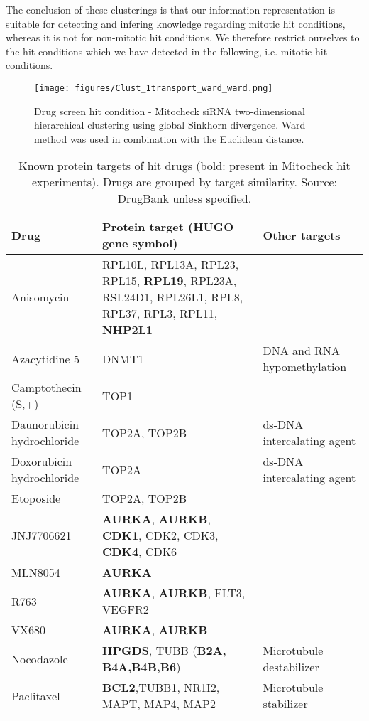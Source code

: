 
The conclusion of these clusterings is that our information representation is suitable for detecting and infering knowledge regarding mitotic hit conditions, whereas it is not for non-mitotic hit conditions. We therefore restrict ourselves to the hit conditions which we have detected in the following, i.e. mitotic hit conditions.


\begin{figure*}[ht!]
\centerline{\texttt{[image: figures/Clust\_1transport\_ward\_ward.png]}}
\caption{Drug screen hit condition - Mitocheck siRNA two-dimensional hierarchical clustering using global Sinkhorn divergence. Ward method was used in combination with the Euclidean distance.}
\label{hitcond_clust_transport}
\end{figure*}

\begin{table}[!ht]
\centering
\caption{Known protein targets of hit drugs (bold: present in Mitocheck hit experiments). Drugs are grouped by target similarity. Source: DrugBank unless specified.}
\label{drug_target}
\begin{tabular}{|L{3cm}|L{7cm}|L{4cm}|}
\hline
Drug & Protein target (HUGO gene symbol) & Other targets\\
\hline
Anisomycin &RPL10L,	RPL13A,	RPL23,	RPL15,	\textbf{RPL19},	RPL23A,	RSL24D1,	RPL26L1,	RPL8,	RPL37,	RPL3,	RPL11, \textbf{NHP2L1} &\\	
\hline							
Azacytidine 5 & DNMT1 & DNA and RNA hypomethylation	\\								
\hline
Camptothecin (S,+)& TOP1&\\								
\hline
Daunorubicin hydrochloride & TOP2A, TOP2B & ds-DNA intercalating agent\\ %
Doxorubicin	hydrochloride &	TOP2A & ds-DNA intercalating agent\\%
Etoposide & TOP2A, TOP2B&\\		%
\hline											
JNJ7706621	& \textbf{AURKA}, \textbf{AURKB}, \textbf{CDK1}, CDK2, CDK3, \textbf{CDK4}, CDK6\cite{pmid16204078} &\\	
MLN8054	& \textbf{AURKA}\cite{pmid20197380} & \\
R763 & \textbf{AURKA}, \textbf{AURKB}, FLT3, VEGFR2~\cite{pmid19609559}&\\
VX680 &	\textbf{AURKA}, \textbf{AURKB}&\\
\hline	
Nocodazole & \textbf{HPGDS}, TUBB (\textbf{B2A, B4A,B4B,B6}) &Microtubule destabilizer\\			
Paclitaxel & \textbf{BCL2},TUBB1, NR1I2, MAPT, MAP4, MAP2 &Microtubule stabilizer\\
\hline
\end{tabular}
\end{table}

